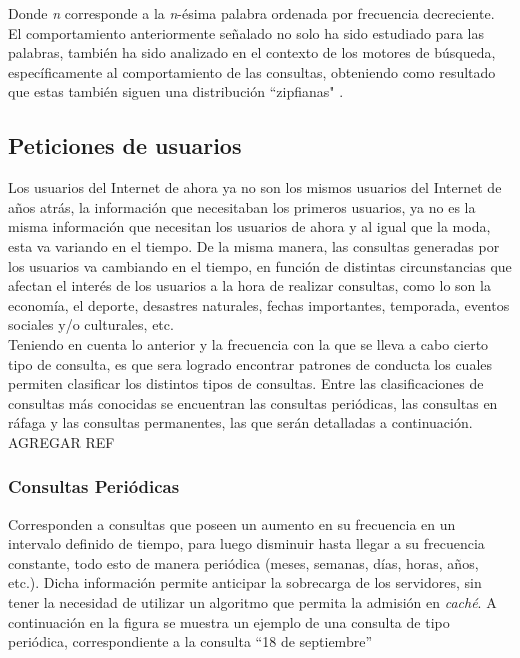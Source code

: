 \documentclass[12pt]{ociamthesis}  %
\begin{document}
Donde \textit{n} corresponde a la \textit{n}-ésima palabra ordenada por frecuencia decreciente. El comportamiento anteriormente señalado no solo ha sido estudiado para las palabras, también ha sido analizado en el contexto de los motores de búsqueda, específicamente al comportamiento de las consultas, obteniendo como resultado que estas también siguen una distribución ``zipfianas" \cite{baeza2012modeling}\cite{cambazoglu2010refreshing}\cite{gan2009improved}\cite{lempel2003predictive}\cite{wang2013impact}\cite{saraiva2001rank}\cite{xie2002locality}.



\subsection{Peticiones de usuarios}
Los usuarios del Internet de ahora ya no son los mismos usuarios del Internet de años atrás, la información que necesitaban los primeros usuarios, ya no es la misma información que necesitan los usuarios de ahora y al igual que la moda, esta va variando en el tiempo. De la misma manera, las consultas generadas por los usuarios va cambiando en el tiempo, en función de distintas circunstancias que afectan el interés de los usuarios a la hora de realizar consultas, como lo son la economía, el deporte, desastres naturales, fechas importantes, temporada, eventos sociales y/o culturales, etc.\\

Teniendo en cuenta lo anterior y la frecuencia con la que se lleva a cabo cierto tipo de consulta, es que sera logrado encontrar patrones de conducta los cuales permiten clasificar los distintos tipos de consultas. Entre las clasificaciones de consultas más conocidas se encuentran las consultas periódicas, las consultas en ráfaga y las consultas permanentes, las que serán detalladas a continuación. AGREGAR REF\\

\subsubsection{Consultas Periódicas}
Corresponden a consultas que poseen un aumento en su frecuencia en un intervalo definido de tiempo, para luego disminuir hasta llegar a su frecuencia constante, todo esto de manera periódica (meses, semanas, días, horas, años, etc.). Dicha información permite anticipar la sobrecarga de los servidores, sin tener la necesidad de utilizar un algoritmo que permita la admisión en \textit{caché}. A continuación en la figura se muestra un ejemplo de una consulta de tipo periódica, correspondiente a la consulta ``18 de septiembre''\\
\end{document}
